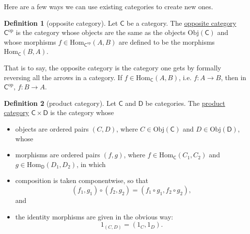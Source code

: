 \documentclass[a4paper]{report}
\newcommand{\defn}[1]{\ul{#1}}
\newcommand{\Obj}{\mathrm{Obj}}
\newcommand{\Hom}{\mathrm{Hom}}
\theoremstyle{definition}
\newtheorem{definition}{Definition}[section]
\theoremstyle{plain}
\theoremstyle{remark}
\begin{document}
Here are a few ways we can use existing categories to create new ones.
\begin{definition}[opposite category]
  \label{def:oppositecategory}
  Let $\mathsf{C}$ be a category. The \defn{opposite category} $\mathsf{C}^{\mathrm{op}}$ is the category whose objects are the same as the objects $\Obj(\mathsf{C})$ and whose morphisms $f \in \Hom_{\mathsf{C}^{\mathrm{op}}}(A, B)$ are defined to be the morphisms $\Hom_{\mathsf{C}}(B, A)$.

  That is to say, the opposite category is the category one gets by formally reversing all the arrows in a category. If $f \in \Hom_{\mathsf{C}}(A, B)$, i.e. $f \colon A \to B$, then in $\mathsf{C}^{\mathrm{op}}$, $f\colon B \to A$. 
\end{definition} 

\begin{definition}[product category]
  \label{def:productcategory}
  Let $\mathsf{C}$ and $\mathsf{D}$ be categories. The \defn{product category} $\mathsf{C} \times \mathsf{D}$ is the category whose 
  \begin{itemize}
    \item objects are ordered pairs $(C, D)$, where $C \in \Obj(\mathsf{C})$ and $D \in \Obj(\mathsf{D})$, whose
    \item morphisms are ordered pairs $(f,g)$, where $f \in \Hom_{\mathsf{C}}(C_{1}, C_{2})$ and $g \in \Hom_{\mathsf{D}}(D_{1}, D_{2})$, in which
    \item composition is taken componentwise, so that
      \begin{equation*}
        (f_{1}, g_{1}) \circ (f_{2},g_{2}) = (f_{1} \circ g_{1}, f_{2} \circ g_{2}),
      \end{equation*}
      and
    \item the identity morphisms are given in the obvious way:
      \begin{equation*}
        1_{(C,D)} = (1_{C}, 1_{D}).
      \end{equation*}
  \end{itemize}
\end{definition}
\end{document}
